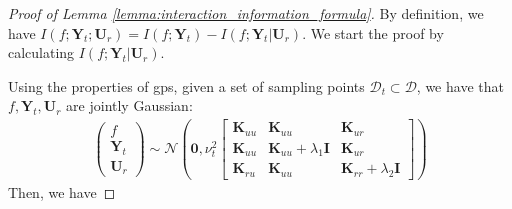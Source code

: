 \begin{proof}[Proof of Lemma \ref{lemma:interaction_information_formula}]
By definition, we have $I (f; \mathbf{Y}_t; \mathbf{U}_r) = I(f; \mathbf{Y}_t) - I (f; \mathbf{Y}_t \rvert \mathbf{U}_r)$. We start the proof by calculating $I (f; \mathbf{Y}_t \rvert \mathbf{U}_r)$.

Using the properties of \acp{gp}, given a set of sampling points $\mathcal{D}_t\subset \mathcal{D}$, we have that $f, \mathbf{Y}_t, \mathbf{U}_r$ are jointly Gaussian:
\begin{align} 
\label{Eqn:joint_gauss_3_variables}
\begin{pmatrix}
    f \\
    \mathbf{Y}_t \\
    \mathbf{U}_r
\end{pmatrix} \sim \mathcal{N} \left(\mathbf{0}, \nu_t^2 \begin{bmatrix}
    \mathbf{K}_{uu} & \mathbf{K}_{uu} & \mathbf{K}_{ur} \\
    \mathbf{K}_{uu} & \mathbf{K}_{uu} + \lambda_1 \mathbf{I} & \mathbf{K}_{ur} \\
    \mathbf{K}_{ru} & \mathbf{K}_{uu} & \mathbf{K}_{rr} + \lambda_2 \mathbf{I}
\end{bmatrix} \right)   
\end{align} 
Then, we have
 

\end{proof}
